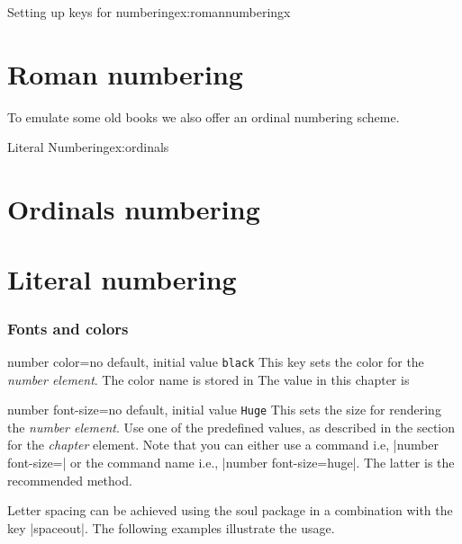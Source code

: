 \begin{decription}
\begin{texexample}{Setting up keys for numbering}{ex:romannumberingx}
\chapter{Roman numbering}
\lorem
\egroup
\end{texexample}





To emulate some old books we also offer an ordinal numbering scheme.

\begin{texexample}{Literal Numbering}{ex:ordinals}
\chapter{Ordinals numbering}
\lorem
{}
\chapter{Literal numbering} 
\lorem
\end{texexample}


\subsection{Fonts and colors}
\begin{docKey}[phd]{number color}{=}{no default, initial value \texttt{black}}
This key sets the color for the \textit{number element}. The color name is stored in %
The value in this chapter is %
\end{docKey}

\begin{docKey}[phd]{number font-size}{=}{no default, initial value \texttt{Huge}}
This sets the size for rendering the \textit{number element}. Use one of the predefined values, as described
in the section for the \emph{chapter} element.
Note that you can either use a command i.e, |number font-size=|\cmd{\huge} 
or the command name i.e., |number font-size=huge|. The latter is the recommended method.
\end{docKey}

Letter spacing can be achieved using the soul package in a combination with the key |spaceout|.
The following examples illustrate the usage.



\end{decription}
